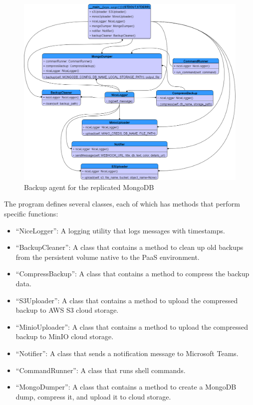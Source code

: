  \begin{figure}[H]\centering
\includegraphics[width=1.0\textwidth,angle=00]{assets/f58.png}
\caption{Backup agent for the replicated MongoDB }
\label{fig:f58}
\end{figure}

The program defines several classes, each of which has methods that perform specific functions: 

\begin{itemize}[label={--}]
\item “NiceLogger”: A logging utility that logs messages with timestamps. 
\item “BackupCleaner”: A class that contains a method to clean up old backups from the persistent volume native to the PaaS environment. 
\item  “CompressBackup”: A class that contains a method to compress the backup  data. 
\item  “S3Uploader”: A class that contains a method to upload the compressed backup to AWS S3 cloud storage. 
\item “MinioUploader”: A class that contains a method to upload the compressed backup to MinIO cloud storage. 
\item  “Notifier”: A class that sends a notification message to Microsoft Teams. 
\item  “CommandRunner”: A class that runs shell commands. 
\item “MongoDumper”: A class that contains a method to create a MongoDB dump, compress it, and upload it to cloud storage. 
\end{itemize}
 
